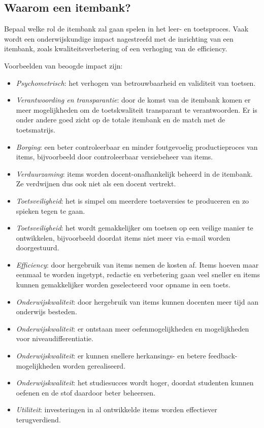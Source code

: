 \documentclass[
]{book}
\providecommand{\tightlist}{%
  \setlength{\itemsep}{0pt}\setlength{\parskip}{0pt}}
\begin{document}
\hypertarget{waarom-een-itembank}{%
\subsection{Waarom een itembank?}\label{waarom-een-itembank}}

Bepaal welke rol de itembank zal gaan spelen in het leer- en toetsproces. Vaak wordt een onderwijskundige impact nagestreefd met de inrichting van een itembank, zoals kwaliteitsverbetering of een verhoging van de efficiency.

Voorbeelden van beoogde impact zijn:

\begin{itemize}
\tightlist
\item
  \emph{Psychometrisch}: het verhogen van betrouwbaarheid en validiteit van toetsen.
\item
  \emph{Verantwoording en transparantie}: door de komst van de itembank komen er meer mogelijkheden om de toetskwaliteit transparant te verantwoorden. Er is onder andere goed zicht op de totale itembank en de match met de toetsmatrijs.
\item
  \emph{Borging}: een beter controleerbaar en minder foutgevoelig productieproces van items, bijvoorbeeld door controleerbaar versiebeheer van items.
\item
  \emph{Verduurzaming}: items worden docent-onafhankelijk beheerd in de itembank. Ze verdwijnen dus ook niet als een docent vertrekt.
\item
  \emph{Toetsveiligheid}: het is simpel om meerdere toetsversies te produceren en zo spieken tegen te gaan.
\item
  \emph{Toetsveiligheid}: het wordt gemakkelijker om toetsen op een veilige manier te ontwikkelen, bijvoorbeeld doordat items niet meer via e-mail worden doorgestuurd.
\item
  \emph{Efficiency}: door hergebruik van items nemen de kosten af. Items hoeven maar eenmaal te worden ingetypt, redactie en verbetering gaan veel sneller en items kunnen gemakkelijker worden geselecteerd voor opname in een toets.
\item
  \emph{Onderwijskwaliteit}: door hergebruik van items kunnen docenten meer tijd aan onderwijs besteden.
\item
  \emph{Onderwijskwaliteit}: er ontstaan meer oefenmogelijkheden en mogelijkheden voor niveaudifferentiatie.
\item
  \emph{Onderwijskwaliteit}: er kunnen snellere herkansings- en betere feedback- mogelijkheden worden gerealiseerd.
\item
  \emph{Onderwijskwaliteit}: het studiesucces wordt hoger, doordat studenten kunnen oefenen en de stof daardoor beter beheersen.
\item
  \emph{Utiliteit}: investeringen in al ontwikkelde items worden effectiever terugverdiend.
\end{itemize}
\end{document}

